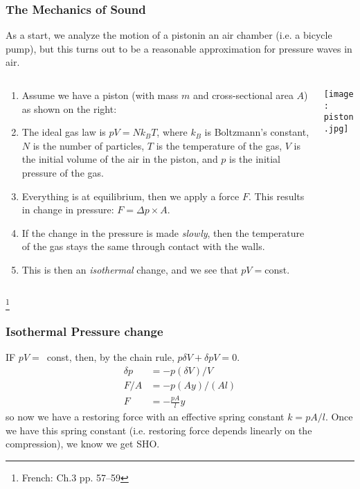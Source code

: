 \documentclass[pdf, handout, hideothersubsections]{beamer}
\begin{document}
\begin{frame}
\frametitle{The Mechanics of Sound}
\fontsize{8.5pt}{10.2}\selectfont
As a start, we analyze the motion of a piston\footnotemark in an air
chamber (i.e. a bicycle pump), but
this turns out to be a reasonable approximation for pressure waves in air.
\pause
\begin{columns}
\begin{column}{0.6\textwidth}
\begin{enumerate}
\item Assume we have a piston (with mass $m$ and cross-sectional area $A$) as shown on the right:
\pause
\item The ideal gas law is $p V = N k_B T$, where $k_B$ is Boltzmann's
  constant, $N$ is the number of particles, $T$ is the temperature of
  the gas, $V$ is the initial volume of the air in the piston, and $p$
  is the initial pressure of the gas.
\pause
\item Everything is at equilibrium, then we apply a force $F$. This
  results in change in pressure: $F = \Delta p \times A$.
\pause
\item If the change in the pressure is made \emph{slowly}, then the
  temperature of the gas stays the same through contact with the
  walls.
\pause
\item This is then an \emph{isothermal} change, and we see that $p V = $const.
\end{enumerate}
\end{column}

\begin{column}{0.4\textwidth}

\texttt{[image: piston.jpg]}

\end{column}
\end{columns}
\footnote[1]{French: Ch.3 pp. 57--59}

\end{frame}


\begin{frame}
\frametitle{Isothermal Pressure change}
IF $p V = $~const, then, by the chain rule, $p \delta V + \delta p V = 0$.\\
\pause
\begin{align}
\delta p &= -p (\delta V)/V \\
F / A    &= -p (A y)/(A l) \\
       F &= - \frac{p A}{l} y
\end{align}
\pause
so now we have a restoring force with an effective spring constant 
$k = p A/l$. Once we have this spring constant (i.e. restoring force
depends linearly on the compression), we know we get SHO.
\end{frame}
\end{document}
